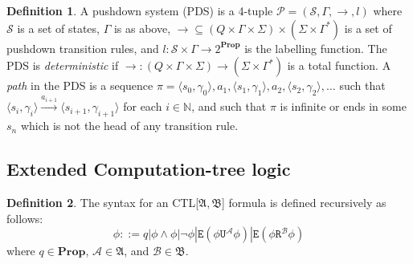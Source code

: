 \documentclass[11pt]{article}
\theoremstyle{definition}
\newtheorem{mydef}{Definition}
\begin{document}
\begin{mydef}
A pushdown system (PDS) is a 4-tuple $\mathcal{P} = (\mathcal{S}, \Gamma,
\rightarrow, l)$ where $\mathcal{S}$ is a set of states, $\Gamma$ is as above,
$\rightarrow \subseteq (Q \times \Gamma \times \Sigma) \times (\Sigma \times
\Gamma^*)$ is a set of pushdown transition rules, and $l: \mathcal{S} \times
\Gamma \rightarrow 2^{\textbf{Prop}}$ is the labelling function. The PDS is
\textit{deterministic} if $\rightarrow : (Q \times \Gamma \times \Sigma)
\rightarrow (\Sigma \times \Gamma^*)$ is a total function.
A \textit{path} in the PDS is a sequence $\pi = \langle s_0, \gamma_0 \rangle,
a_1, \langle s_1, \gamma_1 \rangle, a_2, \langle s_2, \gamma_2 \rangle, \dots$
such that $\langle s_i, \gamma_i \rangle \xrightarrow{a_{i+1}} \langle s_{i+1},
\gamma_{i+1} \rangle $ for each $i \in \mathbb{N}$, and such that $\pi$ is
infinite or ends in some $s_n$ which is not the head of any transition rule.
\end{mydef}





\subsection{Extended Computation-tree logic}

\begin{mydef}
The syntax for an CTL[$\mathfrak{A}, \mathfrak{B}$] formula is defined recursively as follows:
   \[ \phi ::= q | \phi \wedge \phi | \neg \phi | \texttt{E}(\phi \texttt{U}^\mathcal{A} \phi) | \texttt{E}(\phi
   \texttt{R}^\mathcal{B} \phi) \]
where $q \in \textbf{Prop}$, $\mathcal{A} \in \mathfrak{A}$, and $\mathcal{B} \in \mathfrak{B}$.
\end{mydef}
\end{document}
